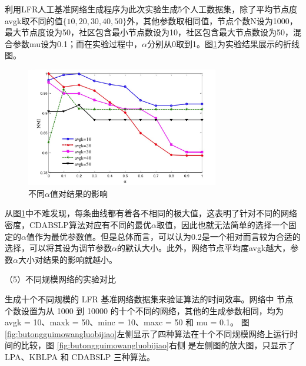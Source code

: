 利用LFR人工基准网络生成程序为此次实验生成5个人工数据集，除了平均节点度avgk取不同的值$ \{ 10,20,30,40,50 \} $外，其他参数取相同值，节点个数N设为1000，最大节点度设为50，社区包含最小节点数设为10，社区包含最大节点数设为50，混合参数mu设为0.1；而在实验过程中，$\alpha$分别从0取到1。图\ref{fig:alpha}为实验结果展示的折线图。

\begin{figure}
  \centering
  \includegraphics[width=0.75\textwidth]{figures/alpha}
  \caption{不同$\alpha$值对结果的影响}\label{fig:alpha}
\end{figure}

从图\ref{fig:alpha}中不难发现，每条曲线都有着各不相同的极大值，这表明了针对不同的网络密度，CDABSLP算法对应有不同的最优$\alpha$取值，因此也就无法简单的选择一个固定的$\alpha$值作为最优参数值。但是总体而言，可以认为0.2是一个相对而言较为合适的选择，可以将其设为调节参数$\alpha$的默认大小。此外，网络节点平均度avgk越大，参数$\alpha$大小对结果的影响就越小。

（5）不同规模网络的实验对比

生成十个不同规模的 LFR 基准网络数据集来验证算法的时间效率。网络中
节点个数设置为从 1000 到 10000 的十个不同的网络，其他的生成参数相同，均为
avgk = 10、maxk = 50、minc = 10、maxc = 50 和 mu = 0.1。 
图\ref{fig:butongguimowangluobijiao}左侧显示了四种算法在十个不同规模网络上运行时间的比较，图 \ref{fig:butongguimowangluobijiao}右侧
是左侧图的放大图，只显示了 LPA、KBLPA 和 CDABSLP 三种算法。

